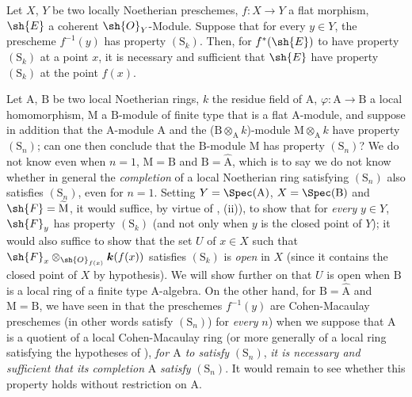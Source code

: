 \begin{corollary}[6.4.2]
\label{IV.6.4.2}
Let $X$, $Y$ be two locally Noetherian preschemes, $f:X\to Y$ a flat morphism, $\sh{E}$ a coherent $\sh{O}_Y$-Module.
Suppose that for every $y\in Y$, the prescheme $f^{-1}(y)$ has property $(\mathrm{S}_k)$.
Then, for $f^*(\sh{E})$ to have property $(\mathrm{S}_k)$ at a point $x$, it is necessary and sufficient that $\sh{E}$ have property $(\mathrm{S}_k)$ at the point $f(x)$.
\end{corollary}

\begin{remark}[6.4.3]
\label{IV.6.4.3}
Let $\mathrm{A}$, $\mathrm{B}$ be two local Noetherian rings, $k$ the residue field of $\mathrm{A}$, $\varphi:\mathrm{A}\to\mathrm{B}$ a local homomorphism, $\mathrm{M}$ a $\mathrm{B}$-module of finite type that is a flat $\mathrm{A}$-module, and suppose in addition that the $\mathrm{A}$-module $\mathrm{A}$ and the ($\mathrm{B}\otimes_\mathrm{A} k$)-module $\mathrm{M}\otimes_\mathrm{A} k$ have property $(\mathrm{S}_n)$; can one then conclude that the $\mathrm{B}$-module $\mathrm{M}$ has property $(\mathrm{S}_n)$?
We do not know even when $n=1$, $\mathrm{M}=\mathrm{B}$ and $\mathrm{B}=\hat{\mathrm{A}}$, which is to say we do not know whether in general the \emph{completion} of a local Noetherian ring satisfying $(\mathrm{S}_n)$ also satisfies $(\mathrm{S}_n)$, even for $n=1$.
Setting $Y=\Spec(\mathrm{A})$, $X=\Spec(\mathrm{B})$ and $\sh{F}=\widetilde{\mathrm{M}}$, it would suffice, by virtue of , (ii)), to show that for \emph{every} $y\in Y$, $\sh{F}_y$ has property $(\mathrm{S}_k)$ (and not only when $y$ is the closed point of $Y$); it would also suffice to show that the set $U$ of $x\in X$ such that $\sh{F}_x\otimes_{\sh{O}_{f(x)}}\boldsymbol{k}(f(x))$ satisfies $(\mathrm{S}_k)$ is \emph{open} in $X$ (since it contains the closed point of $X$ by hypothesis).
We will show further on  that $U$ is open when $\mathrm{B}$ is a local ring of a finite type $\mathrm{A}$-algebra.
On the other hand, for $\mathrm{B}=\hat{\mathrm{A}}$ and $\mathrm{M}=\mathrm{B}$, we have seen in  that the preschemes $f^{-1}(y)$ are Cohen-Macaulay preschemes (in other words satisfy $(\mathrm{S}_n)$) for \emph{every} $n$) when we suppose that $\mathrm{A}$ is a quotient of a local Cohen-Macaulay ring (or more generally of a local ring satisfying the hypotheses of ), \emph{for $\mathrm{A}$ to satisfy} $(\mathrm{S}_n)$, \emph{it is necessary and sufficient that its completion} $\hat{\mathrm{A}}$ \emph{satisfy} $(\mathrm{S}_n)$.
It would remain to see whether this property holds without restriction on $\mathrm{A}$.
\end{remark}

